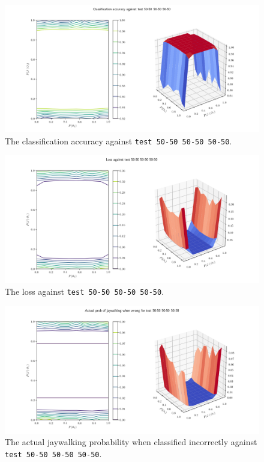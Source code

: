 \documentclass[]{report}
\newcommand{\code}{\texttt}
\begin{document}
% 
% 

\begin{figure}[h]
    \centering
    \centerline{\includegraphics[scale=0.55]{test_50-50_50-50_50-50_accuracy.png}}
    \caption[]{The classification accuracy against \code{test 50-50 50-50 50-50}.}
    \label{fig:test_50-50_50-50_50-50_accuracy_plot}
\end{figure}

\begin{figure}[h]
    \centering
    \centerline{\includegraphics[scale=0.55]{test_50-50_50-50_50-50_loss.png}}
    \caption[]{The loss against \code{test 50-50 50-50 50-50}.}
    \label{fig:test_50-50_50-50_50-50_loss_plot}
\end{figure}

\begin{figure}[h]
    \centering
    \centerline{\includegraphics[scale=0.55]{test_50-50_50-50_50-50_jay_prob.png}}
    \caption[]{The actual jaywalking probability when classified incorrectly against \code{test 50-50 50-50 50-50}.}
    \label{fig:test_50-50_50-50_50-50_jay_prob_plot}
\end{figure}
\end{document}
